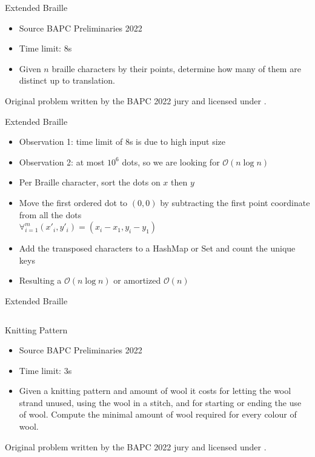 \documentclass[11pt,pdf, aspectratio=169]{beamer}
\begin{document}
  \begin{frame}{Extended Braille}
    \begin{itemize}
      \item Source BAPC Preliminaries 2022
      \item Time limit: 8s
      \item Given $n$ braille characters by their points, determine how many of them are distinct up to translation.
    \end{itemize}
    Original problem written by the BAPC 2022 jury and licensed under \doclicenseLongNameRef.

    \doclicenseImage

  \end{frame}
  \begin{frame}{Extended Braille}
    \begin{itemize}
      \item<+-> Observation 1: time limit of 8s is due to high input size
      \item<+-> Observation 2: at most $10^6$ dots, so we are looking for $\mathcal{O}(n\log{}n)$
      \item<+-> Per Braille character, sort the dots on $x$ then $y$
      \item<+-> Move the first ordered dot to $(0, 0)$ by subtracting the first point coordinate from all the dots\\
      \quad$\forall_{i=1}^m (x'_i, y'_i) = (x_i - x_1, y_i - y_1)$
      \item<+-> Add the transposed characters to a HashMap or Set and count the unique keys
      \item<+-> Resulting a $\mathcal{O}(n\log{}n)$ or amortized $\mathcal{O}(n)$
    \end{itemize}
  \end{frame}
  \begin{frame}[containsverbatim]{Extended Braille}
    \inputminted{python}{code/session-1/python/dapc-e.py}
  \end{frame}
  \begin{frame}{Knitting Pattern}
    \begin{itemize}
      \item Source BAPC Preliminaries 2022
      \item Time limit: 3s
      \item Given a knitting pattern and amount of wool it costs for letting the wool strand unused, using the wool in a stitch, and for starting or ending the use of wool.
      Compute the minimal amount of wool required for every colour of wool.
    \end{itemize}
    Original problem written by the BAPC 2022 jury and licensed under \doclicenseLongNameRef.

    \doclicenseImage
  \end{frame}
\end{document}

